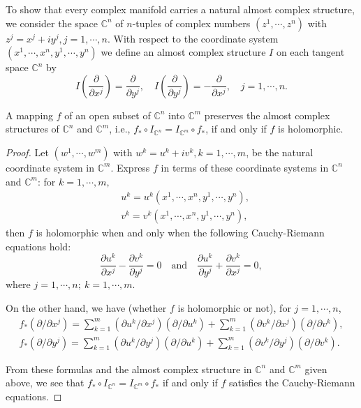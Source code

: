 \documentclass{ctexart}
\begin{document}
To show that every complex manifold carries a natural almost complex structure, we consider the space $\mathbb{C}^{n}$ of $n$-tuples of complex numbers $\left(z^{1}, \cdots, z^{n}\right)$ 
with $z^{j}=x^{j}+i y^{j}, j=1, \cdots, n$. With respect to the coordinate system $\left(x^{1}, \cdots, x^{n}, y^{1}, \cdots, y^{n}\right)$ we define an almost complex structure $I$ 
on each tangent space $\mathbb{C}^{n}$ by
$$
I\left(\frac{\partial}{\partial x^{j}} \right)=\frac{\partial}{\partial y^{j}} , \quad I\left(\frac{\partial}{\partial y^{j}} \right)=-\frac{\partial}{\partial x^{j}}, \quad j=1, \cdots, n.
$$

\begin{lemma}
  A mapping $f$ of an open subset of $\mathbb{C}^{n}$ into $\mathbb{C}^{m}$ preserves the almost complex structures of $\mathbb{C}^{n}$ and $\mathbb{C}^{m}$, 
  i.e., $f_{*} \circ I_{\mathbb{C}^{n}}=I_{\mathbb{C}^{m}} \circ f_{*}$, if and only if $f$ is holomorphic.
\end{lemma}
\begin{proof}[Proof]
  Let $\left(w^{1}, \cdots, w^{m}\right)$ with $w^{k}=u^{k}+i v^{k}, k=1, \cdots, m$, be the natural coordinate system in $\mathbb{C}^{m}$. 
  Express $f$ in terms of these coordinate systems in $\mathbb{C}^{n}$ and $\mathbb{C}^{m}$: for $k=1, \cdots, m,$
  $$
  \begin{aligned}
  &u^{k}=u^{k}\left(x^{1}, \cdots, x^{n}, y^{1}, \cdots, y^{n}\right), \\
  &v^{k}=v^{k}\left(x^{1}, \cdots, x^{n}, y^{1}, \cdots, y^{n}\right),
  \end{aligned}
  $$
  then $f$ is holomorphic when and only when the following Cauchy-Riemann equations hold:
  $$
  \frac{\partial u^{k}}{\partial x^{j}} - \frac{\partial v^{k}}{\partial y^{j}} =0\quad\text{and}\quad\frac{\partial u^{k}}{\partial y^{j}} + \frac{\partial v^{k}}{\partial x^{j}} =0,
  $$
  where $j=1, \cdots, n ; \ k=1, \cdots, m .$

  On the other hand, we have (whether $f$ is holomorphic or not), for $j=1, \cdots, n$, 
  $$
  \begin{gathered}
  f_{*}\left(\partial / \partial x^{j}\right)=\sum_{k=1}^{m}\left(\partial u^{k} / \partial x^{j}\right)\left(\partial / \partial u^{k}\right)+\sum_{k=1}^{m}\left(\partial v^{k} / \partial x^{j}\right)\left(\partial / \partial v^{k}\right), \\
  f_{*}\left(\partial / \partial y^{j}\right)=\sum_{k=1}^{m}\left(\partial u^{k} / \partial y^{j}\right)\left(\partial / \partial u^{k}\right)+\sum_{k=1}^{m}\left(\partial v^{k} / \partial y^{j}\right)\left(\partial / \partial v^{k}\right). 
  \end{gathered}
  $$

  From these formulas and the almost complex structure in $\mathbb{C}^{n}$ and $\mathbb{C}^{m}$ given above, we see that $f_{*} \circ I_{\mathbb{C}^{n}}=I_{\mathbb{C}^{m}} \circ f_{*}$ 
  if and only if $f$ satisfies the Cauchy-Riemann equations.
\end{proof}
\end{document}
